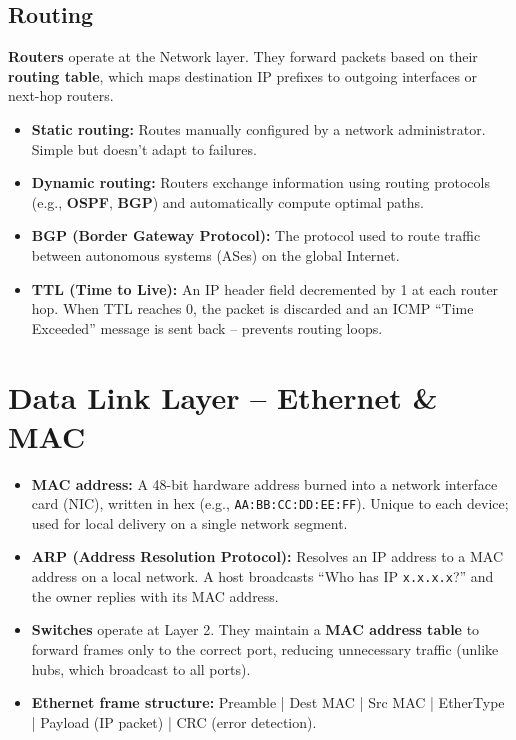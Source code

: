 \documentclass[11pt, letterpaper]{article}
\begin{document}
\subsection*{Routing}

\textbf{Routers} operate at the Network layer. They forward packets based on their \textbf{routing table}, which maps destination IP prefixes to outgoing interfaces or next-hop routers.

\begin{itemize}[noitemsep]
  \item \textbf{Static routing:} Routes manually configured by a network administrator. Simple but doesn't adapt to failures.
  \item \textbf{Dynamic routing:} Routers exchange information using routing protocols (e.g., \textbf{OSPF}, \textbf{BGP}) and automatically compute optimal paths.
  \item \textbf{BGP (Border Gateway Protocol):} The protocol used to route traffic between autonomous systems (ASes) on the global Internet.
  \item \textbf{TTL (Time to Live):} An IP header field decremented by 1 at each router hop. When TTL reaches 0, the packet is discarded and an ICMP ``Time Exceeded'' message is sent back -- prevents routing loops.
\end{itemize}

\section*{Data Link Layer -- Ethernet \& MAC}

\begin{itemize}[noitemsep]
  \item \textbf{MAC address:} A 48-bit hardware address burned into a network interface card (NIC), written in hex (e.g., \texttt{AA:BB:CC:DD:EE:FF}). Unique to each device; used for local delivery on a single network segment.
  \item \textbf{ARP (Address Resolution Protocol):} Resolves an IP address to a MAC address on a local network. A host broadcasts ``Who has IP \texttt{x.x.x.x}?'' and the owner replies with its MAC address.
  \item \textbf{Switches} operate at Layer 2. They maintain a \textbf{MAC address table} to forward frames only to the correct port, reducing unnecessary traffic (unlike hubs, which broadcast to all ports).
  \item \textbf{Ethernet frame structure:} Preamble | Dest MAC | Src MAC | EtherType | Payload (IP packet) | CRC (error detection).
\end{itemize}
\end{document}
